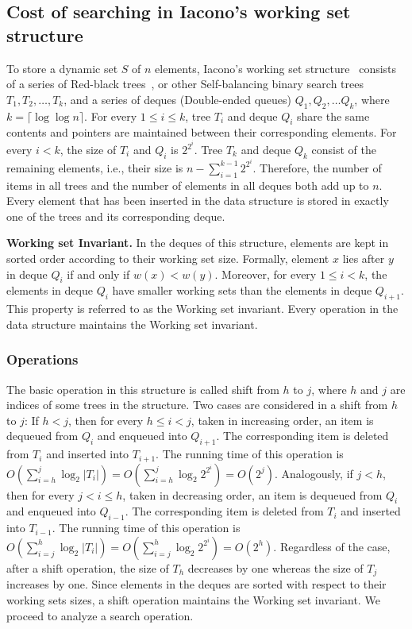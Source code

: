 \documentclass[11pt]{article}       %
\begin{document}
\subsection{Cost of searching in Iacono's working set structure}

To store a dynamic set $S$ of $n$ elements, Iacono's working set structure~\cite{iacono2001alternatives} consists of a series of Red-black trees~\cite{guibas1978dichromatic}, or other Self-balancing binary search trees $T_1, T_2, \ldots, T_k$, and a series of deques (Double-ended queues) $Q_1, Q_2, \ldots Q_k$, where $k = \lceil \log \log n\rceil$. 
For every $1\leq i\leq k$, tree $T_i$ and deque $Q_i$ share the same contents and pointers are maintained between their corresponding elements. For every $ i < k $, the size of $T_i$ and $Q_i$ is $2^{2^i}$. Tree $T_k$ and deque $Q_k$ consist of the remaining elements, i.e.,  their size is $n - \sum_{i=1}^{k-1} 2^{2^i}$. Therefore, the number of items in all trees and the number of elements in all deques both add up to $n$.
Every element that has been inserted in the data structure is stored in exactly one of the trees and its corresponding deque. 

\textbf{Working set Invariant.}
In the deques of this structure, elements are kept in sorted order according to their working set size.
Formally, element $x$ lies after $y$ in deque $Q_i$ if and only if $w(x)< w(y)$. Moreover, for every $1\leq i < k$, the elements in deque $Q_i$ have smaller working sets than the elements in deque $Q_{i+1}$. This property is referred to as the Working set invariant. Every operation in the data structure maintains the Working set invariant.

\subsubsection*{Operations}
The basic operation in this structure is called shift from $h$ to $j$, where $h$ and $j$ are indices of some trees in the structure. 
Two cases are considered in a shift from $h$ to $j$: If $h< j$, then for every $h\leq i < j$, taken in increasing order, an item is dequeued from $Q_i$ and enqueued into $Q_{i+1}$. The corresponding item is deleted from $T_i$ and inserted into $T_{i+1}$. The running time of this operation is $O(\sum_{i=h}^{j} \log_2 |T_i|) = O(\sum_{i=h}^{j} \log_2 2^{2^i}) = O(2^j)$. 
Analogously, if $ j< h$, then for every $j < i \leq h$, taken in decreasing order, an item is dequeued from $Q_i$ and enqueued into $Q_{i-1}$. The corresponding item is deleted from $T_i$ and inserted into $T_{i-1}$. The running time of this operation is $O(\sum_{i=j}^{h} \log_2 |T_i|) = O(\sum_{i=j}^{h} \log_2 2^{2^i}) = O(2^ h)$. 
Regardless of the case, after a shift operation, the size of $T_h$ decreases by one whereas the size of $T_j$ increases by one.
Since elements in the deques are sorted with respect to their working sets sizes, a shift operation maintains the Working set invariant. We proceed to analyze a search operation.
\end{document}

